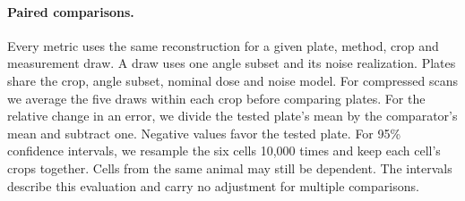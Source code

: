\paragraph{Paired comparisons.}
Every metric uses the same reconstruction for a given plate, method, crop and measurement draw. A draw uses one angle subset and its noise realization. Plates share the crop, angle subset, nominal dose and noise model. For compressed scans we average the five draws within each crop before comparing plates. For the relative change in an error, we divide the tested plate's mean by the comparator's mean and subtract one. Negative values favor the tested plate. For 95\% confidence intervals, we resample the six cells 10,000 times and keep each cell's crops together. Cells from the same animal may still be dependent. The intervals describe this evaluation and carry no adjustment for multiple comparisons.

